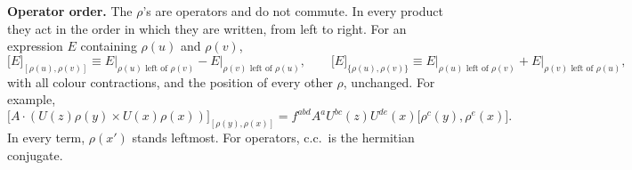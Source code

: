 \documentclass[10pt]{article}
\begin{document}
\noindent\textbf{Operator order.} The $\rho$'s are operators and do not commute. In every product they act in the order in which they are written, from left to right. For an expression $E$ containing $\rho(u)$ and $\rho(v)$,
\begin{equation*}
\big[E\big]_{[\rho(u),\rho(v)]}\equiv E\big|_{\rho(u)\text{ left of }\rho(v)}-E\big|_{\rho(v)\text{ left of }\rho(u)},\qquad
\big[E\big]_{\{\rho(u),\rho(v)\}}\equiv E\big|_{\rho(u)\text{ left of }\rho(v)}+E\big|_{\rho(v)\text{ left of }\rho(u)},
\end{equation*}
with all colour contractions, and the position of every other $\rho$, unchanged. For example,
\begin{equation*}
\big[A\cdot(U(z)\rho(y)\times U(x)\rho(x))\big]_{[\rho(y),\rho(x)]}=f^{abd}A^{a}U^{bc}(z)U^{de}(x)\big[\rho^{c}(y),\rho^{e}(x)\big].
\end{equation*}
In every term, $\rho(x')$ stands leftmost. For operators, c.c.\ is the hermitian conjugate.
\end{document}
